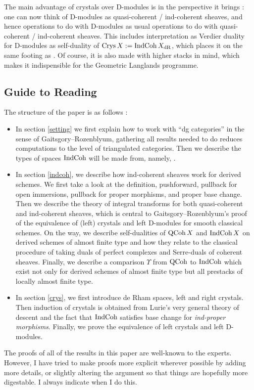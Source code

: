 \documentclass[./main.tex]{subfiles}
\begin{document}
The main advantage of crystals over D-modules is 
in the perspective it brings : 
one can now think of D-modules as quasi-coherent / ind-coherent sheaves,
and hence operations to do with D-modules as usual operations
to do with quasi-coherent / ind-coherent sheaves.
This includes interpretation as Verdier duality for D-modules as 
self-duality of $\mathrm{Crys}\,X := \mathrm{IndCoh}\,X_{\mathrm{dR}}$,
which places it on the same footing as .
Of course, it is also made with higher stacks in mind,
which makes it indispensible for the Geometric Langlands programme.

\subsection{Guide to Reading}

The structure of the paper is as follows : 
\begin{itemize}
  \item In section \ref{setting}
  we first explain how to work with ``dg categories'' in the sense of
  Gaitsgory--Rozenblyum, gathering all results needed to
  do reduces computations to the level of triangulated categories.
  Then we describe the types of spaces $\mathrm{IndCoh}$ will be made from,
  namely, .
  \item In section \ref{indcoh},
  we describe how ind-coherent sheaves work for derived schemes.
  We first take a look at the definition, 
  pushforward, pullback for open immersions,
  pullback for proper morphisms, and proper base change.
  Then we describe the theory of integral transforms
  for both quasi-coherent and ind-coherent sheaves,
  which is central to Gaitsgory--Rozenblyum's proof of
  the equivalence of (left) crystals and left D-modules
  for smooth classical schemes.
  On the way, we describe self-dualities of $\mathrm{QCoh}\,X$ and $\mathrm{IndCoh}\,X$
  on derived schemes of almost finite type
  and how they relate to the classical procedure of 
  taking duals of perfect complexes and Serre-duals of coherent sheaves.
  Finally, we describe a comparison $\Upsilon$ from
  $\mathrm{QCoh}$ to $\mathrm{IndCoh}$ which exist not only for derived schemes of
  almost finite type but all prestacks of locally almost finite type.
  \item In section \ref{crys},
  we first introduce de Rham spaces, left and right crystals.
  Then induction of crystals is obtained from
  Lurie's very general theory of descent and 
  the fact that $\mathrm{IndCoh}$ satisfies base change for
  \emph{ind-proper morphisms}.
  Finally, we prove the equivalence of left crystals and left D-modules.
\end{itemize}

\begin{rmk}
  
  The proofs of all of the results in this paper
  are well-known to the experts.
  However, I have tried to make proofs more explicit
  wherever possible by adding more details, 
  or slightly altering the argument so that things are 
  hopefully more digestable.
  I always indicate when I do this.

\end{rmk}
\end{document}
